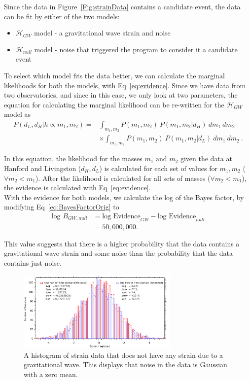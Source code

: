\documentclass{article}
\makeatletter
\newcommand\mynobreakpar{\par\nobreak\@afterheading}
\makeatother
\begin{document}
 Since the data in Figure~\ref{Fig:strainData} contains a candidate event, the data can be fit by either of the two models:  \mynobreakpar
 \begin{itemize}
 	\item $\mathcal{H}_{GW}$ model - a gravitational wave strain and noise \mynobreakpar
 	\item $\mathcal{H}_{null}$ model - noise that triggered the program to consider it a candidate event
 \end{itemize}
 
 To select which model fits the data better, we can calculate the marginal likelihoods for both the models, with Eq~\ref{eq:evidence}. Since we have data from two observatories, and since in this case, we only look at two parameters, the equation for calculating the marginal likelihood can be re-written for the $\mathcal{H}_{GW}$ model as 
 \begin{align*}
 	P(d_L,d_H | h\propto m_1, m_2) = & \int_{m_1, m_2} { P(m_1,m_2) \ P(m_1,m_2 | d_H)\ dm_1\ dm_2 } \\
 	& \times \int_{m_1, m_2} { P(m_1,m_2) \ P(m_1,m_2 | d_L)\ dm_1\ dm_2 } \ .
 \end{align*}
 
 
 In this equation, the likelihood for the masses $m_1 \text{ and } m_2$ given the data at Hanford and Livingston ($d_H, d_L$) is calculated for each set of values for $m_1,m_2$ ($\forall m_2 < m_1$). After the likelihood is calculated for all sets of masses ($\forall m_2 < m_1$), the evidence is calculated with Eq~\ref{eq:evidence}.\\
 
 
 With the evidence for both models, we calculate the log of the Bayes factor, by modifying Eq~\ref{eq:BayesFactorOrig} to 
 \begin{align*}
\text{log }B_{GW,null} &= \text{log Evidence}_{GW} - \text{log Evidence}_{null} \\
&= 50,000,000.
 \end{align*}
 
  This value suggests that there is a higher probability that the data contains a gravitational wave strain and some noise than the probability that the data contains just noise.\\ 
 
 
    \begin{figure}[h]
    	\centering
    	\includegraphics[width=0.7\textwidth]{Figures/NoiseHistogram.pdf} 
    	\caption{A histogram of strain data that does not have any strain due to a gravitational wave. This displays that noise in the data is Gaussian with a zero mean.}
    	\label{Fig:NoiseHist}
    \end{figure}
    
\end{document}
